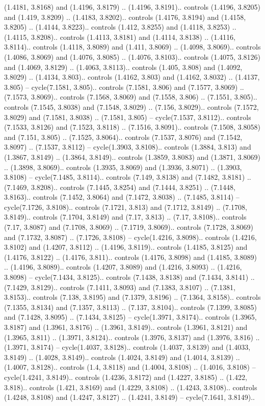 (1.4181, 3.8168) and (1.4196, 3.8179) .. (1.4196, 3.8191).. controls (1.4196, 3.8205) and (1.419, 3.8209) .. (1.4183, 3.8202).. controls (1.4176, 3.8194) and (1.4158, 3.8205) .. (1.4144, 3.8223).. controls (1.412, 3.8255) and (1.4118, 3.8253) .. (1.4115, 3.8208).. controls (1.4113, 3.8181) and (1.4114, 3.8138) .. (1.4116, 3.8114).. controls (1.4118, 3.8089) and (1.411, 3.8069) .. (1.4098, 3.8069).. controls (1.4086, 3.8069) and (1.4076, 3.8085) .. (1.4076, 3.8103).. controls (1.4075, 3.8126) and (1.4069, 3.8129) .. (1.4063, 3.8113).. controls (1.405, 3.808) and (1.4092, 3.8029) .. (1.4134, 3.803).. controls (1.4162, 3.803) and (1.4162, 3.8032) .. (1.4137, 3.805) -- cycle(7.1581, 3.805).. controls (7.1581, 3.806) and (7.1577, 3.8069) .. (7.1573, 3.8069).. controls (7.1568, 3.8069) and (7.1558, 3.806) .. (7.1551, 3.805).. controls (7.1545, 3.8038) and (7.1548, 3.8029) .. (7.156, 3.8029).. controls (7.1572, 3.8029) and (7.1581, 3.8038) .. (7.1581, 3.805) -- cycle(7.1537, 3.8112).. controls (7.1533, 3.8126) and (7.1523, 3.8118) .. (7.1516, 3.8091).. controls (7.1508, 3.8058) and (7.151, 3.805) .. (7.1525, 3.8064).. controls (7.1537, 3.8076) and (7.1542, 3.8097) .. (7.1537, 3.8112) -- cycle(1.3903, 3.8108).. controls (1.3884, 3.813) and (1.3867, 3.8149) .. (1.3864, 3.8149).. controls (1.3859, 3.8083) and (1.3871, 3.8069) .. (1.3898, 3.8069).. controls (1.3935, 3.8069) and (1.3936, 3.8071) .. (1.3903, 3.8108) -- cycle(7.1485, 3.8114).. controls (7.149, 3.8138) and (7.1482, 3.8181) .. (7.1469, 3.8208).. controls (7.1445, 3.8254) and (7.1444, 3.8251) .. (7.1448, 3.8163).. controls (7.1452, 3.8064) and (7.1472, 3.8038) .. (7.1485, 3.8114) -- cycle(7.1726, 3.8108).. controls (7.1721, 3.813) and (7.1712, 3.8149) .. (7.1708, 3.8149).. controls (7.1704, 3.8149) and (7.17, 3.813) .. (7.17, 3.8108).. controls (7.17, 3.8087) and (7.1708, 3.8069) .. (7.1719, 3.8069).. controls (7.1728, 3.8069) and (7.1732, 3.8087) .. (7.1726, 3.8108) -- cycle(1.4216, 3.8098).. controls (1.4216, 3.8102) and (1.4207, 3.8112) .. (1.4196, 3.8119).. controls (1.4185, 3.8125) and (1.4176, 3.8122) .. (1.4176, 3.811).. controls (1.4176, 3.8098) and (1.4185, 3.8089) .. (1.4196, 3.8089).. controls (1.4207, 3.8089) and (1.4216, 3.8093) .. (1.4216, 3.8098) -- cycle(7.1434, 3.8125).. controls (7.1438, 3.8138) and (7.1434, 3.8141) .. (7.1429, 3.8129).. controls (7.1411, 3.8093) and (7.1383, 3.8107) .. (7.1381, 3.8153).. controls (7.138, 3.8195) and (7.1379, 3.8196) .. (7.1364, 3.8158).. controls (7.1355, 3.8134) and (7.1357, 3.8113) .. (7.137, 3.8104).. controls (7.1399, 3.8085) and (7.1428, 3.8095) .. (7.1434, 3.8125) -- cycle(1.3971, 3.8174).. controls (1.3965, 3.8187) and (1.3961, 3.8176) .. (1.3961, 3.8149).. controls (1.3961, 3.8121) and (1.3965, 3.811) .. (1.3971, 3.8124).. controls (1.3976, 3.8137) and (1.3976, 3.816) .. (1.3971, 3.8174) -- cycle(1.4037, 3.8128).. controls (1.4037, 3.8139) and (1.4033, 3.8149) .. (1.4028, 3.8149).. controls (1.4024, 3.8149) and (1.4014, 3.8139) .. (1.4007, 3.8128).. controls (1.4, 3.8118) and (1.4004, 3.8108) .. (1.4016, 3.8108) -- cycle(1.4241, 3.8149).. controls (1.4236, 3.8172) and (1.4227, 3.8185) .. (1.422, 3.818).. controls (1.421, 3.8169) and (1.4229, 3.8108) .. (1.4243, 3.8108).. controls (1.4248, 3.8108) and (1.4247, 3.8127) .. (1.4241, 3.8149) -- cycle(7.1641, 3.8149).. 